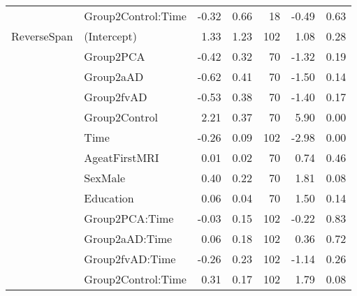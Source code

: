 \documentclass[]{article}
\begin{document}
\begin{table}[ht]
{\begin{tabular}{llrrrrr}
   & Group2Control:Time & -0.32 & 0.66 & 18 & -0.49 & 0.63 \\ 
  ReverseSpan & (Intercept) & 1.33 & 1.23 & 102 & 1.08 & 0.28 \\ 
   & Group2PCA & -0.42 & 0.32 & 70 & -1.32 & 0.19 \\ 
   & Group2aAD & -0.62 & 0.41 & 70 & -1.50 & 0.14 \\ 
   & Group2fvAD & -0.53 & 0.38 & 70 & -1.40 & 0.17 \\ 
   & Group2Control & 2.21 & 0.37 & 70 & 5.90 & 0.00 \\ 
   & Time & -0.26 & 0.09 & 102 & -2.98 & 0.00 \\ 
   & AgeatFirstMRI & 0.01 & 0.02 & 70 & 0.74 & 0.46 \\ 
   & SexMale & 0.40 & 0.22 & 70 & 1.81 & 0.08 \\ 
   & Education & 0.06 & 0.04 & 70 & 1.50 & 0.14 \\ 
   & Group2PCA:Time & -0.03 & 0.15 & 102 & -0.22 & 0.83 \\ 
   & Group2aAD:Time & 0.06 & 0.18 & 102 & 0.36 & 0.72 \\ 
   & Group2fvAD:Time & -0.26 & 0.23 & 102 & -1.14 & 0.26 \\ 
   & Group2Control:Time & 0.31 & 0.17 & 102 & 1.79 & 0.08 \\ 
   \hline
\end{tabular}
}
\end{table}
\end{document}
